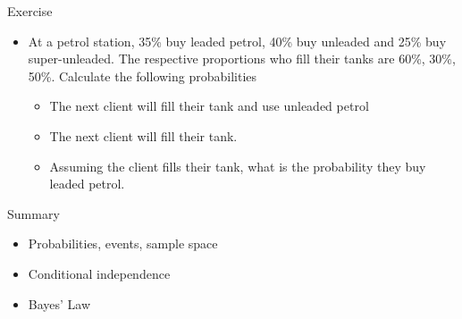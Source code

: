 \documentclass{beamer}
\begin{document}
\begin{frame}{Exercise} 
 \begin{itemize} 
  \item At a petrol station, 35\% buy leaded petrol, 40\% buy unleaded and 25\% buy super-unleaded. The respective proportions who fill their tanks are 60\%, 30\%, 50\%. Calculate the following probabilities 
\begin{itemize}
\item  The next client will fill their tank and use unleaded petrol 
\item The next client will fill their tank. 
\item Assuming the client fills their tank, what is the probability they buy leaded petrol. 
\end{itemize}
 \end{itemize}
\end{frame}

\begin{frame}{Summary}
 \begin{itemize} 
  \item Probabilities, events, sample space  
  \item Conditional independence
  \item Bayes' Law 
 \end{itemize}

\end{frame}
\end{document}
